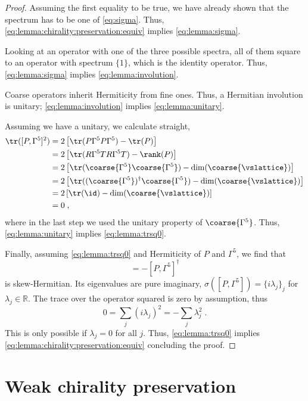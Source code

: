 \begin{proof}
Assuming the first equality to be true, we have already shown that the spectrum has to be one of \cref{eq:sigma}.
Thus, \cref{eq:lemma:chirality:preservation:equiv} implies \cref{eq:lemma:sigma}.

Looking at an operator with one of the three possible spectra, all of them square to an operator with spectrum $\{1\}$, which is the identity operator.
Thus, \cref{eq:lemma:sigma} implies \cref{eq:lemma:involution}.

Coarse operators inherit Hermiticity from fine ones.
Thus, a Hermitian involution is unitary; \cref{eq:lemma:involution} implies \cref{eq:lemma:unitary}.

Assuming we have a unitary, we calculate straight,
\begin{align}
\tr([P, \Gamma^{5}]^{2})
&= 2 \left[ \tr(P \Gamma^{5} P \Gamma^{5})  - \tr(P) \right] \\
&= 2 \left[ \tr(R \Gamma^{5} T R \Gamma^{5} T)  - \rank(P) \right] \\
&= 2 \left[ \tr( \coarse{\Gamma^{5}} \coarse{\Gamma^{5}} )  - \dim(\coarse{\vslattice}) \right] \\
&= 2 \left[ \tr( (\coarse{\Gamma^{5}})^{\dagger} \coarse{\Gamma^{5}} )  - \dim(\coarse{\vslattice}) \right] \\
&= 2 \left[ \tr( \id )  - \dim(\coarse{\vslattice}) \right] \\
&= 0 \;,
\end{align}
where in the last step we used the unitary property of $\coarse{\Gamma^{5}}$.
Thus, \cref{eq:lemma:unitary} implies \cref{eq:lemma:trsq0}.

Finally, assuming \cref{eq:lemma:trsq0} and Hermiticity of $P$ and $\Gamma^{5}$, we find that
\begin{equation}
[P, \Gamma^{5}] = - [P, \Gamma^{5}]^{\dagger}
\end{equation}
is skew-Hermitian.
Its eigenvalues are pure imaginary, $\sigma([P, \Gamma^{5}]) = \{ i \lambda_j\}_j$ for $\lambda_j \in \mathbb{R}$.
The trace over the operator squared is zero by assumption, thus
\begin{equation}
0 = \sum_{j} (i \lambda_j)^2 = - \sum_{j} \lambda_j^2 \;.
\end{equation}
This is only possible if $\lambda_j=0$ for all $j$.
Thus, \cref{eq:lemma:trsq0} implies \cref{eq:lemma:chirality:preservation:equiv} concluding the proof.
\end{proof}

\section{Weak chirality preservation}

